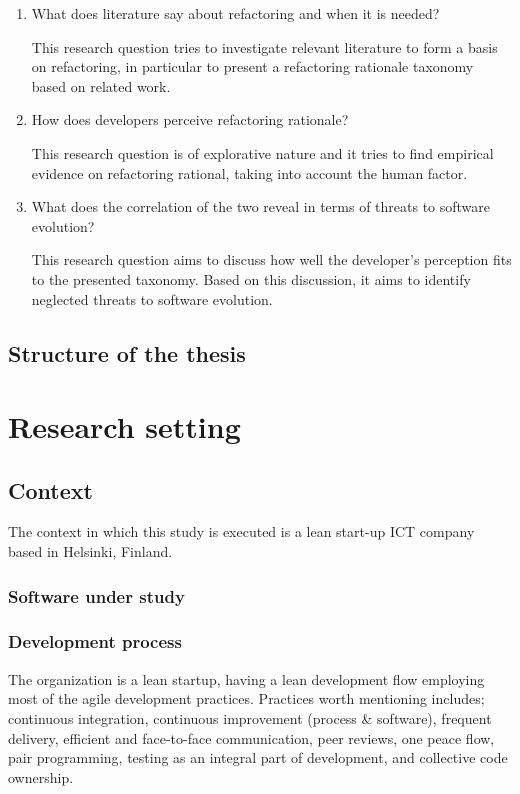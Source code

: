 \documentclass[english,12pt,a4paper,pdftex,sci,utf8]{aaltothesis}
\begin{document}
\begin{enumerate}[label=\textbf{RQ\arabic*}]
\item What does literature say about refactoring and when it is needed?

This research question tries to investigate relevant literature to form a basis on refactoring, in particular to present a refactoring rationale taxonomy based on related work.
\item How does developers perceive refactoring rationale?

This research question is of explorative nature and it tries to find empirical evidence on refactoring rational, taking into account the human factor. 
\item What does the correlation of the two reveal in terms of threats to software evolution?

This research question aims to discuss how well the developer's perception fits to the presented taxonomy. Based on this discussion, it aims to identify neglected threats to software evolution.
\end{enumerate}

\subsection{Structure of the thesis} \label{structure}
\clearpage

\section{Research setting} \label{research setting}

\subsection{Context} \label{context}
The context in which this study is executed is a lean start-up ICT company based in Helsinki, Finland.
\subsubsection*{Software under study} \label{software}
\subsubsection*{Development process} \label{process}
The organization is a lean startup, having a lean development flow employing most of the agile development practices. Practices worth mentioning includes; continuous integration, continuous improvement (process & software), frequent delivery, efficient and face-to-face communication, peer reviews, one peace flow, pair programming, testing as an integral part of development, and collective code ownership.  
\end{document}

